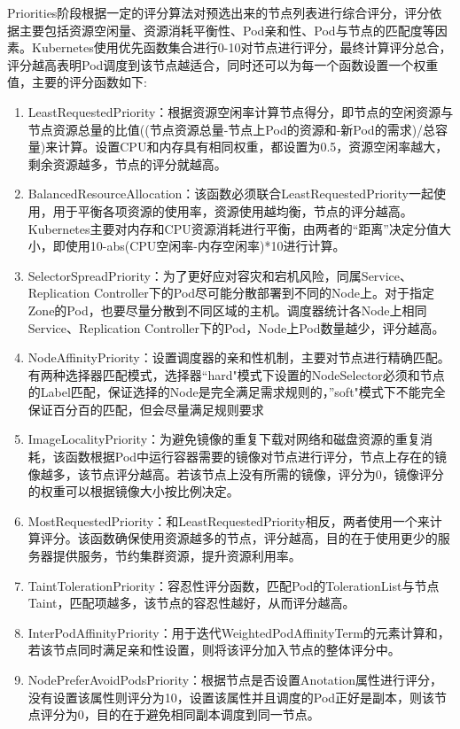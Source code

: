 Priorities阶段根据一定的评分算法对预选出来的节点列表进行综合评分，评分依据主要包括资源空闲量、资源消耗平衡性、Pod亲和性、Pod与节点的匹配度等因素。Kubernetes使用优先函数集合进行0-10对节点进行评分，最终计算评分总合，评分越高表明Pod调度到该节点越适合，同时还可以为每一个函数设置一个权重值，主要的评分函数如下:
\begin{enumerate}[(1)]
	\item LeastRequestedPriority：根据资源空闲率计算节点得分，即节点的空闲资源与节点资源总量的比值((节点资源总量-节点上Pod的资源和-新Pod的需求)/总容量)来计算。设置CPU和内存具有相同权重，都设置为0.5，资源空闲率越大，剩余资源越多，节点的评分就越高。
	\item BalancedResourceAllocation：该函数必须联合LeastRequestedPriority一起使用，用于平衡各项资源的使用率，资源使用越均衡，节点的评分越高。Kubernetes主要对内存和CPU资源消耗进行平衡，由两者的“距离”决定分值大小，即使用10-abs(CPU空闲率-内存空闲率)*10进行计算。
	\item SelectorSpreadPriority：为了更好应对容灾和宕机风险，同属Service、Replication Controller下的Pod尽可能分散部署到不同的Node上。对于指定Zone的Pod，也要尽量分散到不同区域的主机。调度器统计各Node上相同Service、Replication Controller下的Pod，Node上Pod数量越少，评分越高。
	\item NodeAffinityPriority：设置调度器的亲和性机制，主要对节点进行精确匹配。有两种选择器匹配模式，选择器“hard"模式下设置的NodeSelector必须和节点的Label匹配，保证选择的Node是完全满足需求规则的，”soft"模式下不能完全保证百分百的匹配，但会尽量满足规则要求
	\item ImageLocalityPriority：为避免镜像的重复下载对网络和磁盘资源的重复消耗，该函数根据Pod中运行容器需要的镜像对节点进行评分，节点上存在的镜像越多，该节点评分越高。若该节点上没有所需的镜像，评分为0，镜像评分的权重可以根据镜像大小按比例决定。
	\item MostRequestedPriority：和LeastRequestedPriority相反，两者使用一个来计算评分。该函数确保使用资源越多的节点，评分越高，目的在于使用更少的服务器提供服务，节约集群资源，提升资源利用率。
	\item TaintTolerationPriority：容忍性评分函数，匹配Pod的TolerationList与节点Taint，匹配项越多，该节点的容忍性越好，从而评分越高。
	\item InterPodAffinityPriority：用于迭代WeightedPodAffinityTerm的元素计算和，若该节点同时满足亲和性设置，则将该评分加入节点的整体评分中。
	\item NodePreferAvoidPodsPriority：根据节点是否设置Anotation属性进行评分，没有设置该属性则评分为10，设置该属性并且调度的Pod正好是副本，则该节点评分为0，目的在于避免相同副本调度到同一节点。
\end{enumerate}

